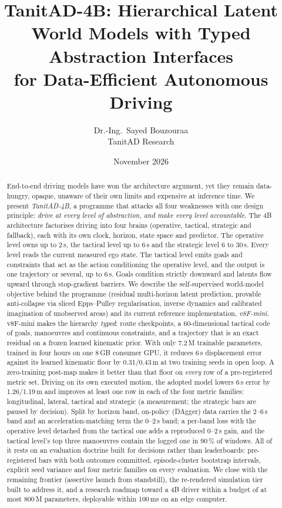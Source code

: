 \documentclass[10pt,twocolumn]{article}
\title{\vspace{-6mm}\textbf{TanitAD-4B: Hierarchical Latent World Models with Typed Abstraction Interfaces\\for Data-Efficient Autonomous Driving}}
\author{Dr.-Ing.\ Sayed Bouzouraa\\[1mm]\normalsize TanitAD Research}
\date{November 2026}
\theoremstyle{remark}
\begin{document}
\maketitle

\begin{abstract}
End-to-end driving models have won the architecture argument, yet they remain data-hungry, opaque, unaware of their own limits and
expensive at inference time. We present \emph{TanitAD-4B}, a programme that attacks all four weaknesses with one design principle:
\emph{drive at every level of abstraction, and make every level accountable}. The 4B architecture factorises driving into four
brains (operative, tactical, strategic and fallback), each with its own clock, horizon, state space and predictor. The operative
level owns up to 2\,s, the tactical level up to 6\,s and the strategic level 6 to 30\,s. Every level reads the current measured ego state.
The tactical level emits goals and constraints that act as the action conditioning the operative level, and the output is one
trajectory or several, up to 6\,s. Goals condition strictly downward and latents flow upward through stop-gradient barriers. We describe the self-supervised world-model objective
behind the programme (residual multi-horizon latent prediction, provable anti-collapse via sliced Epps--Pulley regularisation,
inverse dynamics and calibrated imagination of unobserved areas) and its current reference implementation, \emph{v8F-mini}.
v8F-mini makes the hierarchy \emph{typed}: route checkpoints, a 60-dimensional tactical code of goals, manoeuvres and continuous
constraints, and a trajectory that is an exact residual on a frozen learned kinematic prior. With only 7.2\,M trainable parameters,
trained in four hours on one 8\,GB consumer GPU, it reduces 6\,s displacement error against its learned kinematic floor by
0.31/0.43\,m at two training seeds in open loop. A zero-training post-map makes it better than that floor on \emph{every} row of a
pre-registered metric set. Driving on its own executed motion, the adopted model lowers 6\,s error by 1.26/1.19\,m and improves at
least one row in each of the four metric families: longitudinal, lateral, tactical and strategic (a measurement; the strategic bars are paused by decision). Split by horizon band, on-policy (DAgger) data carries the 2--6\,s band and an acceleration-matching term the 0--2\,s band; a per-band loss with the operative level detached from the tactical one adds a reproduced 0--2\,s gain, and the tactical level's top three manoeuvres contain the logged one in 90\,\% of windows. All of it rests on an evaluation
doctrine built for decisions rather than leaderboards: pre-registered bars with both outcomes committed, episode-cluster bootstrap
intervals, explicit seed variance and four metric families on every evaluation. We close with the remaining frontier (assertive
launch from standstill), the re-rendered simulation tier built to address it, and a research roadmap toward a 4B driver within a
budget of at most 800\,M parameters, deployable within 100\,ms on an edge computer.
\end{abstract}
\end{document}
